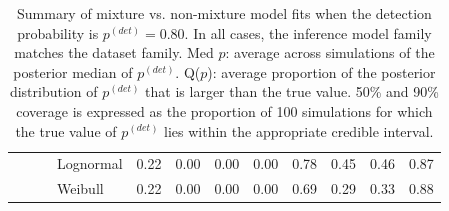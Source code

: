 \documentclass[useAMS,usenatbib,referee,12pt]{article}
\newcommand{\pdet}{p^{(det)}}
\begin{document}
\begin{table}[ht]
\begin{tabular}{l|l|l|l|cccc|cccc}
   &  &  & Lognormal & 0.22 & 0.00 & 0.00 & 0.00 & 0.78 & 0.45 & 0.46 & 0.87 \\ 
   &  &  & Weibull & 0.22 & 0.00 & 0.00 & 0.00 & 0.69 & 0.29 & 0.33 & 0.88 \\ 
   \hline
\end{tabular}
\caption{Summary of mixture vs. non-mixture model fits when the detection probability is $\pdet =0.80$.  
In all cases, the inference model family matches the dataset family.  
Med $p$: average across simulations of the posterior median of $\pdet$.  
Q($p$): average proportion of the posterior distribution of $\pdet$ that is larger than the true value.  
50\% and 90\% coverage is expressed as the proportion of 100 simulations for which the true value of $\pdet$ lies within the appropriate credible interval.}


\vspace{1.2cm}


\end{table}
\end{document}
